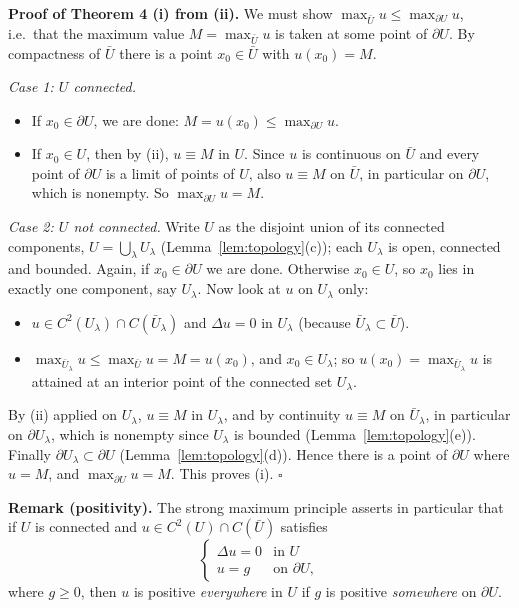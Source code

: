 \documentclass[11pt]{article}
\theoremstyle{plain}
\theoremstyle{definition}
\theoremstyle{remark}
\begin{document}
\textbf{Proof of Theorem 4 (i) from (ii).} We must show $\max_{\bar U} u \leq \max_{\partial U} u$, i.e.\ that the maximum value $M = \max_{\bar U} u$ is taken at some point of $\partial U$. By compactness of $\bar U$ there is a point $x_0 \in \bar U$ with $u(x_0) = M$.

\emph{Case 1: $U$ connected.}
\begin{itemize}
    \item If $x_0 \in \partial U$, we are done: $M = u(x_0) \leq \max_{\partial U} u$.
    \item If $x_0 \in U$, then by (ii), $u \equiv M$ in $U$. Since $u$ is continuous on $\bar U$ and every point of $\partial U$ is a limit of points of $U$, also $u \equiv M$ on $\bar U$, in particular on $\partial U$, which is nonempty. So $\max_{\partial U} u = M$.
\end{itemize}

\emph{Case 2: $U$ not connected.} Write $U$ as the disjoint union of its connected components, $U = \bigcup_\lambda U_\lambda$ (Lemma~\ref{lem:topology}(c)); each $U_\lambda$ is open, connected and bounded. Again, if $x_0 \in \partial U$ we are done. Otherwise $x_0 \in U$, so $x_0$ lies in exactly one component, say $U_\lambda$. Now look at $u$ on $U_\lambda$ only:
\begin{itemize}
    \item $u \in C^2(U_\lambda) \cap C(\bar U_\lambda)$ and $\Delta u = 0$ in $U_\lambda$ (because $\bar U_\lambda \subset \bar U$).
    \item $\max_{\bar U_\lambda} u \leq \max_{\bar U} u = M = u(x_0)$, and $x_0 \in U_\lambda$; so $u(x_0) = \max_{\bar U_\lambda} u$ is attained at an interior point of the connected set $U_\lambda$.
\end{itemize}
By (ii) applied on $U_\lambda$, $u \equiv M$ in $U_\lambda$, and by continuity $u \equiv M$ on $\bar U_\lambda$, in particular on $\partial U_\lambda$, which is nonempty since $U_\lambda$ is bounded (Lemma~\ref{lem:topology}(e)). Finally $\partial U_\lambda \subset \partial U$ (Lemma~\ref{lem:topology}(d)). Hence there is a point of $\partial U$ where $u = M$, and $\max_{\partial U} u = M$. This proves (i). $\square$

\textbf{Remark (positivity).} The strong maximum principle asserts in particular that if $U$ is connected and $u \in C^2(U) \cap C(\bar U)$ satisfies
$$ \begin{cases} \Delta u = 0 & \text{in } U \\ u = g & \text{on } \partial U, \end{cases} $$
where $g \geq 0$, then $u$ is positive \emph{everywhere} in $U$ if $g$ is positive \emph{somewhere} on $\partial U$.
\end{document}
